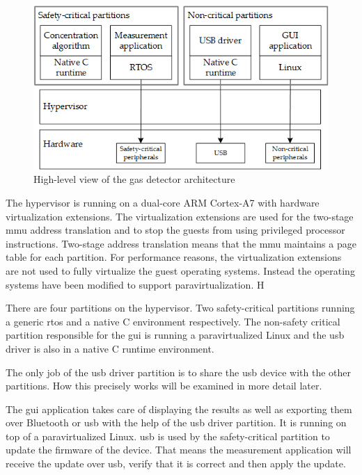 \begin{figure}[ht!]
\centering
\includegraphics[scale=0.75]{Figures/gas_detect_high_level_no_ipc_with_criticality.png}
\decoRule
\caption{High-level view of the gas detector architecture}
\label{fig:gas_detect_high_level}
\end{figure}

\newcommand{\bToa}{3}
\newcommand{\bToc}{1}
\newcommand{\cTob}{2}
\newcommand{\usbToa}{4}
\newcommand{\aTousb}{4}
\newcommand{\usbTob}{5}
\newcommand{\bTousb}{5}

The hypervisor is running on a dual-core ARM Cortex-A7 with hardware virtualization extensions. The virtualization extensions are used for the two-stage \acrshort{mmu} address translation and to stop the guests from using privileged processor instructions. Two-stage address translation means that the \acrshort{mmu} maintains a page table for each partition. 
For performance reasons, the virtualization extensions are not used to fully virtualize the guest operating systems. Instead the operating systems have been modified to support paravirtualization. H

There are four partitions on the hypervisor. Two safety-critical partitions running a generic \acrshort{rtos} and a native C environment respectively. The non-safety critical partition responsible for the \acrshort{gui} is running a paravirtualized Linux and the \acrshort{usb} driver is also in a native C runtime environment. 

The only job of the \acrshort{usb} driver partition is to share the \acrshort{usb} device with the other partitions. How this precisely works will be examined in more detail later.

The \acrshort{gui} application takes care of displaying the results as well as exporting them over Bluetooth or \acrshort{usb} with the help of the \acrshort{usb} driver partition. It is running on top of a paravirtualized Linux. \acrshort{usb} is used by the safety-critical partition to update the firmware of the device. That means the measurement application will receive the update over \acrshort{usb}, verify that it is correct and then apply the update.

